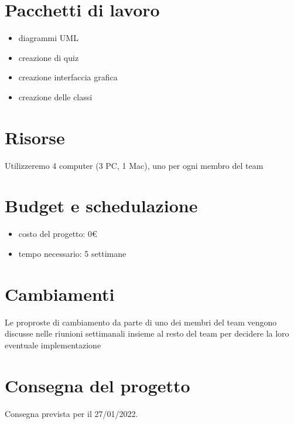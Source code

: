 \documentclass[12pt]{article}
\begin{document}
\section{Pacchetti di lavoro}
\begin{itemize}
	\item diagrammi UML
	\item creazione di quiz
	\item creazione interfaccia grafica
	\item creazione delle classi
\end{itemize}

\section{Risorse}
Utilizzeremo 4 computer (3 PC, 1 Mac), uno per ogni membro del team

\section{Budget e schedulazione}
\begin{itemize}
	\item costo del progetto: 0€
	\item tempo necessario: 5 settimane
\end{itemize}

\section{Cambiamenti}
Le proproste di cambiamento da parte di uno dei membri del team vengono
discusse nelle riunioni settimanali insieme al resto del team per decidere la
loro eventuale implementazione

\section{Consegna del progetto}
Consegna prevista per il 27/01/2022.
\end{document}

